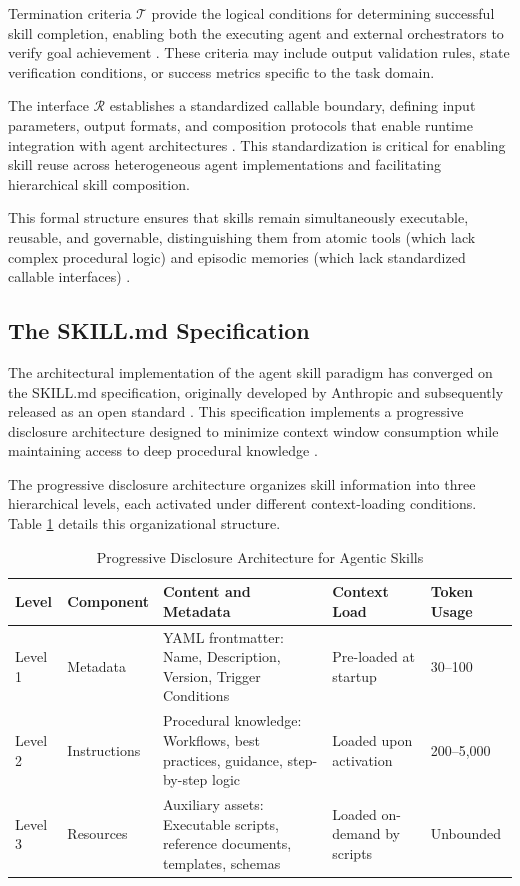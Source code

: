 \documentclass[11pt,a4paper]{article}
\begin{document}
Termination criteria $\mathcal{T}$ provide the logical conditions for determining successful skill completion, enabling both the executing agent and external orchestrators to verify goal achievement \cite{arxiv2024skillsemantics}. These criteria may include output validation rules, state verification conditions, or success metrics specific to the task domain.

The interface $\mathcal{R}$ establishes a standardized callable boundary, defining input parameters, output formats, and composition protocols that enable runtime integration with agent architectures \cite{arxiv2024skillsemantics}. This standardization is critical for enabling skill reuse across heterogeneous agent implementations and facilitating hierarchical skill composition.

This formal structure ensures that skills remain simultaneously executable, reusable, and governable, distinguishing them from atomic tools (which lack complex procedural logic) and episodic memories (which lack standardized callable interfaces) \cite{arxiv2024skillsemantics}.

\subsection{The SKILL.md Specification}

The architectural implementation of the agent skill paradigm has converged on the SKILL.md specification, originally developed by Anthropic and subsequently released as an open standard \cite{microsoft2024skillsdk, lmkit2024agentskills}. This specification implements a progressive disclosure architecture designed to minimize context window consumption while maintaining access to deep procedural knowledge \cite{alphaxiv2024skills, arxiv2024skillframework}.

The progressive disclosure architecture organizes skill information into three hierarchical levels, each activated under different context-loading conditions. Table \ref{tab:progressive} details this organizational structure.

\begin{table}[htp]
\centering
\caption{Progressive Disclosure Architecture for Agentic Skills}
\label{tab:progressive}
\begin{tabular}{@{}p{1.5cm}p{2.5cm}p{5cm}p{3cm}p{2cm}@{}}
\toprule
\textbf{Level} & \textbf{Component} & \textbf{Content and Metadata} & \textbf{Context Load} & \textbf{Token Usage} \\
\midrule
Level 1 & Metadata & YAML frontmatter: Name, Description, Version, Trigger Conditions & Pre-loaded at startup & 30--100 \\
Level 2 & Instructions & Procedural knowledge: Workflows, best practices, guidance, step-by-step logic & Loaded upon activation & 200--5,000 \\
Level 3 & Resources & Auxiliary assets: Executable scripts, reference documents, templates, schemas & Loaded on-demand by scripts & Unbounded \\
\bottomrule
\end{tabular}
\end{table}
\end{document}
